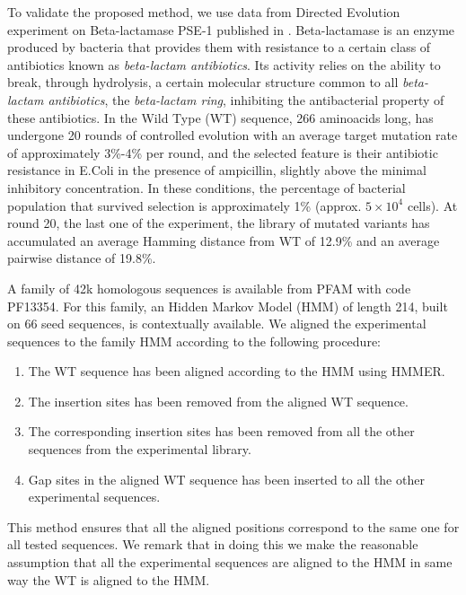 To validate the proposed method, we use data from Directed Evolution experiment on Beta-lactamase PSE-1 published in \cite{stiffler_proteinstructureexperimental_2020}.
Beta-lactamase is an enzyme produced by bacteria that provides them with resistance to a certain class of antibiotics known as \textit{beta-lactam antibiotics}. Its activity relies on the ability to break, through hydrolysis, a certain molecular structure common to all \textit{beta-lactam antibiotics}, the \textit{beta-lactam ring}, inhibiting the antibacterial property of these antibiotics.
In \cite{stiffler_proteinstructureexperimental_2020} the Wild Type (WT) sequence, 266 aminoacids long, has undergone 20 rounds of controlled evolution with an average target mutation rate of approximately 3\%-4\% per round, and the selected feature is their antibiotic resistance in E.Coli in the presence of ampicillin, slightly above the minimal inhibitory concentration. In these conditions, the percentage of bacterial population that survived selection is approximately 1\% (approx. $5 \times 10^4$ cells).
At round 20, the last one of the experiment, the library of mutated variants has accumulated an average Hamming distance from WT of 12.9\% and an average pairwise distance of 19.8\%.

A family of 42k homologous sequences is available from PFAM with code PF13354.
For this family, an Hidden Markov Model (HMM) of length 214, built on 66 seed sequences, is contextually available.
We aligned the experimental sequences to the family HMM according to the following procedure:
\begin{enumerate}
	\item The WT sequence has been aligned according to the HMM using HMMER.
	\item The insertion sites has been removed from the aligned WT sequence.
	\item The corresponding insertion sites has been removed from all the other sequences from the experimental library.
	\item Gap sites in the aligned WT sequence has been inserted to all the other experimental sequences.
\end{enumerate}
This method ensures that all the aligned positions correspond to the same one for all tested sequences. We remark that in doing this we make the reasonable assumption that all the experimental sequences are aligned to the HMM in same way the WT is aligned to the HMM.

